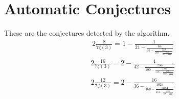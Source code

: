 \documentclass{article}%
\begin{document}
%
\normalsize%
\section{Automatic Conjectures}%
\label{sec:AutomaticConjectures}%
These are the conjectures detected by the algorithm.%
\begin{alignat*}{2}%
\frac{8}{7 \zeta\left(3\right)} = 1 - \frac{1}{21 - \frac{64}{95 - \frac{729}{259 - \frac{4096}{549 - \frac{15625}{..}}}}}%
\end{alignat*}%
\begin{alignat*}{2}%
\frac{16}{7 \zeta\left(3\right)} = 2 - \frac{4}{42 - \frac{256}{190 - \frac{2916}{518 - \frac{16384}{1098 - \frac{62500}{..}}}}}%
\end{alignat*}%
\begin{alignat*}{2}%
\frac{12}{7 \zeta\left(3\right)} = 2 - \frac{16}{36 - \frac{1024}{160 - \frac{11664}{434 - \frac{65536}{918 - \frac{250000}{..}}}}}%
\end{alignat*}

%
\end{document}
